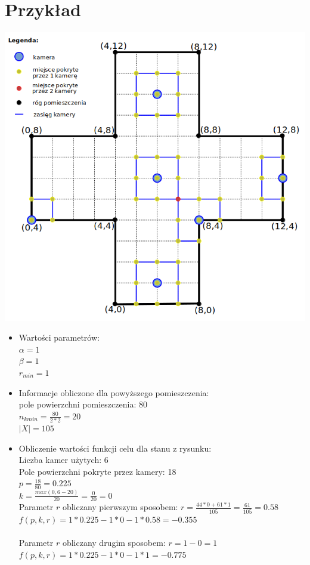 \documentclass[12pt,a4paper]{article}
\begin{document}
%
\section{Przykład}
\begin{center}
	\includegraphics[scale=0.6]{img/example.png}
\end{center}


\begin{itemize}
	\item Wartości parametrów:\\
	$\alpha = 1$\\
	$\beta = 1$\\
	$r_{min} = 1$
	\item Informacje obliczone dla powyższego pomieszczenia:\\
	pole powierzchni pomieszczenia: 80\\
	$n_{kmin} = \frac{80}{2*2} = 20$\\
	$|X| = 105$
	\item Obliczenie wartości funkcji celu dla stanu z rysunku:\\
	Liczba kamer użytych: 6\\
	Pole powierzchni pokryte przez kamery: 18\\
	$p = \frac{18}{80} = 0.225$\\
	$k = \frac{max(0, 6-20)}{20} = \frac{0}{20} = 0$\\
	Parametr $r$ obliczany pierwszym sposobem:
	$r = \frac{44*0 + 61*1}{105} = \frac{61}{105} = 0.58$\\
	$f(p, k, r) = 1*0.225 - 1*0 - 1*0.58 = -0.355$\\\\
	Parametr $r$ obliczany drugim sposobem:
	$r = 1-0 = 1$\\
	$f(p, k, r) = 1*0.225 - 1*0 - 1*1 = -0.775$
\end{itemize}
\end{document}
